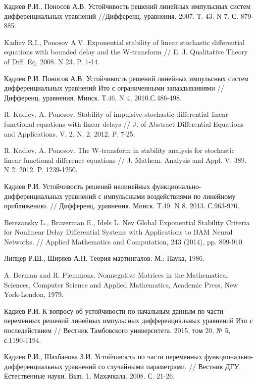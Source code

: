 \begin{thebibliography}{111}
	Кадиев Р.И., Поносов А.В. Устойчивость решений линейных импульсных систем дифференциальных уравнений //Дифференц. уравнения. 2007. Т. 43. N 7. С. 879-885.
	
	Kadiev R.I., Ponosov A.V. Exponential stability of linear stochastic differential equations with bounded delay and the W-transform // E. J. Qualitative Theory of Diff. Eq. 2008. N 23. P. 1-14.
	
	Кадиев Р.И. Поносов А.В. Устойчивость решений линейных импульсных систем дифференциальных уравнений Ито с ограниченными запаздываниями // Дифференц. уравнения. Минск. Т.46. N 4, 2010.С.486-498.
	
	R. Kadiev, A. Ponosov. Stability of impulsive stochastic differential linear functional	equations with linear delays // J. of Abstract Differential Equations and Applications. V. 2. N. 2, 2012. P. 7-25.
	
	R. Kadiev, A. Ponosov. The W-transform in stability analysis for stochastic linear functional difference equations // J. Mathem. Analysis and Appl. V. 389. N 2. 2012. P. 1239-1250.
	
	Кадиев Р.И. Устойчивость решений нелинейных функционально-дифференциальных уравнений с импульсными воздействиями по линейному приближению. // Дифференц. уравнения. Минск. Т.49. N 8. 2013. С.963-970.
	
	Berezansky L., Braverman E., Idels L. Nev Global Exponential Stability Criteria for	Nonlinear Delay Differential Systems with Applications to BAM Neural Networks. // Applied Mathematics and Computation, 243 (2014), pp. 899-910.
	
	Липцер Р.Ш., Ширяев А.Н. Теория мартингалов. М.: Наука, 1986.
	
	A. Berman and R. Plemmons, Nonnegative Matrices in the Mathematical Sciences, Computer Science and Applied Mathematics, Academic Press, New York-London, 1979.
	
	Кадиев Р.И. К вопросу об устойчивости по начальным данным по части переменных решений линейных импульсных	дифференциальных уравнений Ито с последействием // Вестник Тамбовского университета. 2015, том 20, № 5, с.1190-1194.
	
	Кадиев Р.И., Шахбанова З.И. Устойчивость по части переменных функционально-дифференциальных уравнений со случайными параметрами. // Вестник ДГУ. Естественные науки. Вып. 1. Махачкала. 2008. С. 21-26.
	

\end{thebibliography}
